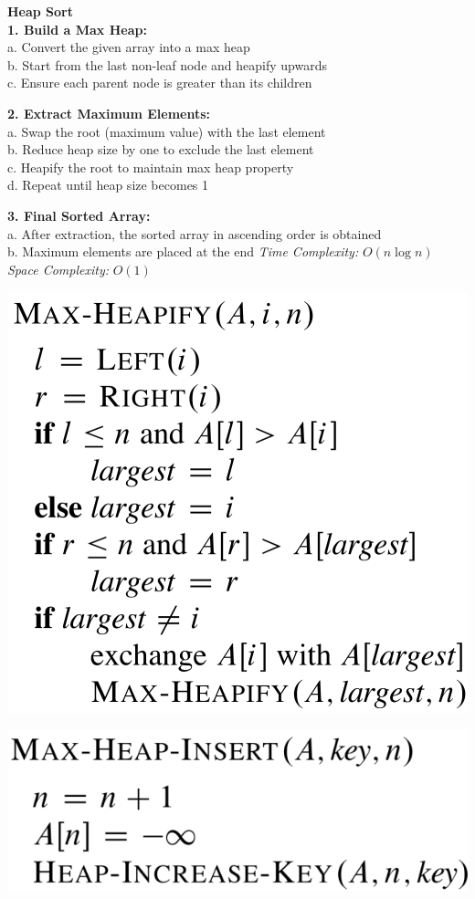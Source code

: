 {{\begin{minipage}[t]{0.6\textwidth}
        \textbf{\scriptsize Heap Sort}\\[-1px]
        \textbf{1. Build a Max Heap:}\\
        a. Convert the given array into a max heap\\
        b. Start from the last non-leaf node and heapify upwards\\
        c. Ensure each parent node is greater than its children
        
        \textbf{2. Extract Maximum Elements:}\\
        a. Swap the root (maximum value) with the last element\\
        b. Reduce heap size by one to exclude the last element\\
        c. Heapify the root to maintain max heap property\\
        d. Repeat until heap size becomes 1
        
        \textbf{3. Final Sorted Array:}\\
        a. After extraction, the sorted array in ascending order is obtained\\
        b. Maximum elements are placed at the end
        \textit{Time Complexity:} \(O(n\log n)\) \quad \textit{Space Complexity:} \(O(1)\)
    \end{minipage}
    \hfill
    \begin{minipage}[t]{0.35\textwidth}
        \vspace{2pt}
        \includegraphics[width=0.7\linewidth]{images/heapify.png}
        \vspace{6pt}
        
        \includegraphics[width=0.7\linewidth]{images/heap-insert.png}
        \vspace{6pt}
        

\end{minipage}}}
